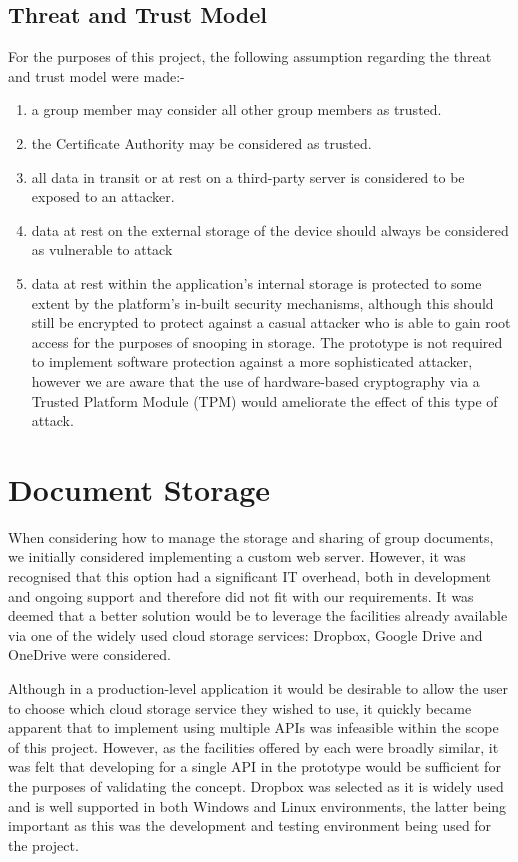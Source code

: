 \subsection*{Threat and Trust Model}
For the purposes of this project, the following assumption regarding the threat and trust model were made:-
\begin{enumerate}[itemsep=3pt]
\item a group member may consider all other group members as trusted.
\item the Certificate Authority may be considered as trusted.  
\item all data in transit or at rest on a third-party server is considered to be exposed to an attacker.
\item data at rest on the external storage of the device should always be considered as vulnerable to attack 
\item  data at rest within the application's internal storage is protected to some extent by the platform's in-built security mechanisms, although this should still be encrypted to protect against a casual attacker who is able to gain root access for the purposes of snooping in storage.  The prototype is not required to implement software protection against a more sophisticated attacker, however we are aware that the use of hardware-based cryptography via a Trusted Platform Module (TPM) would ameliorate the effect of this type of attack.
\end{enumerate} 


\section{Document Storage}
When considering how to manage the storage and sharing of group documents, we initially considered implementing a custom web server.  However, it was recognised that this option had a significant IT overhead, both in development and ongoing support and therefore did not fit with our requirements.  It was deemed that a better solution would be to leverage the facilities already available via one of the widely used cloud storage services:  Dropbox, Google Drive and OneDrive were considered.  

Although in a production-level application it would be desirable to allow the user to choose which cloud storage service they wished to use, it quickly became apparent that to implement using multiple APIs was infeasible within the scope of this project.  However, as the facilities offered by each were broadly similar, it was felt that developing for a single API in the prototype would be sufficient for the purposes of validating the concept.  Dropbox was selected as it is widely used and is well supported in both Windows and Linux environments, the latter being important as this was the development and testing environment being used for the project.  

